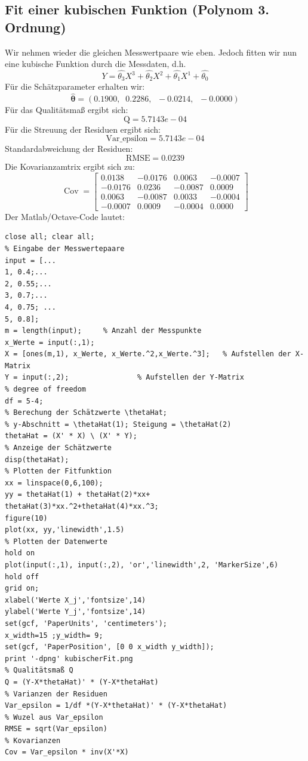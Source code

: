 \subsection{Fit einer kubischen Funktion (Polynom 3. Ordnung)}
Wir nehmen wieder die gleichen Messwertpaare wie eben. Jedoch fitten wir 
nun eine kubische Funktion durch die Messdaten, d.h. 
\begin{equation}
Y = \hat{\theta_3} X^3 + \hat{\theta_2} X^2 + \hat{\theta_1} X^1 +
\hat{\theta_0} 
\end{equation}
Für die Schätzparameter erhalten wir: 
\[\hat{\boldsymbol\theta} = 
(0.1900, \;\; 0.2286,\;\; -0.0214, \;\; -0.0000) \]
Für das Qualitätsmaß ergibt sich: 
\[\mathrm{Q} = 5.7143e-04 \]
Für die Streuung der Residuen ergibt sich: 
\[\mathrm{Var\_epsilon} = 5.7143e-04 \]
Standardabweichung der Residuen: 
\[
\mathrm{RMSE} = 0.0239 \]
Die Kovarianzamtrix ergibt sich zu: 
\[
\operatorname{Cov} =
\begin{bmatrix}
0.0138  & -0.0176  &  0.0063  & -0.0007 \\
-0.0176 &   0.0236 &  -0.0087 &  0.0009 \\
0.0063  &  -0.0087 &   0.0033 &  -0.0004 \\
-0.0007 &   0.0009 &  -0.0004  &  0.0000
\end{bmatrix}
\]
Der Matlab/Octave-Code lautet: 
\begin{verbatim}
close all; clear all;
% Eingabe der Messwertepaare
input = [...                 
1, 0.4;...                
2, 0.55;...
3, 0.7;...
4, 0.75; ...
5, 0.8];
m = length(input);     % Anzahl der Messpunkte
x_Werte = input(:,1);
X = [ones(m,1), x_Werte, x_Werte.^2,x_Werte.^3];   % Aufstellen der X-Matrix
Y = input(:,2);                % Aufstellen der Y-Matrix
% degree of freedom 
df = 5-4;
% Berechung der Schätzwerte \thetaHat; 
% y-Abschnitt = \thetaHat(1); Steigung = \thetaHat(2)
thetaHat = (X' * X) \ (X' * Y);    
% Anzeige der Schätzwerte
disp(thetaHat);
% Plotten der Fitfunktion
xx = linspace(0,6,100);
yy = thetaHat(1) + thetaHat(2)*xx+ thetaHat(3)*xx.^2+thetaHat(4)*xx.^3;
figure(10)
plot(xx, yy,'linewidth',1.5)
% Plotten der Datenwerte 
hold on
plot(input(:,1), input(:,2), 'or','linewidth',2, 'MarkerSize',6)
hold off
grid on; 
xlabel('Werte X_j','fontsize',14)
ylabel('Werte Y_j','fontsize',14)
set(gcf, 'PaperUnits', 'centimeters');
x_width=15 ;y_width= 9;
set(gcf, 'PaperPosition', [0 0 x_width y_width]);
print '-dpng' kubischerFit.png
% Qualitätsmaß Q
Q = (Y-X*thetaHat)' * (Y-X*thetaHat)
% Varianzen der Residuen
Var_epsilon = 1/df *(Y-X*thetaHat)' * (Y-X*thetaHat)
% Wuzel aus Var_epsilon
RMSE = sqrt(Var_epsilon)
% Kovarianzen
Cov = Var_epsilon * inv(X'*X)
\end{verbatim}
